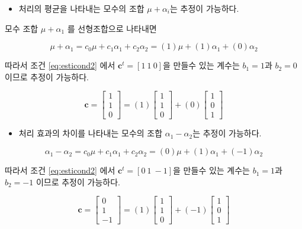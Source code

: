 \documentclass[
]{book}
\providecommand{\tightlist}{%
  \setlength{\itemsep}{0pt}\setlength{\parskip}{0pt}}
\theoremstyle{definition}
\theoremstyle{definition}
\theoremstyle{definition}
\theoremstyle{definition}
\theoremstyle{remark}
\begin{document}
\begin{itemize}
\tightlist
\item
  처리의 평균을 나타내는 모수의 조합 \(\mu + \alpha_i\)는 추정이 가능하다.
\end{itemize}

모수 조합 \(\mu + \alpha_1\) 를 선형조합으로 나타내면

\[ \mu + \alpha_1 = c_0 \mu + c_1 \alpha_1 + c_2 \alpha_2 = (1) \mu + (1) \alpha_1 + (0) \alpha_2 \]

따라서 조건 \eqref{eq:esticond2} 에서 \(\bm c^t = [1~1~0]\)을 만들수 있는 계수는 \(b_1=1\)과 \(b_2=0\) 이므로 추정이 가능하다.

\begin{equation*}
\bm c =
\begin{bmatrix}
1 \\
1 \\
0 
\end{bmatrix}
= 
(1)
\begin{bmatrix}
1 \\
1 \\
0 
\end{bmatrix}
+ 
(0)
\begin{bmatrix}
1 \\
0 \\
1 
\end{bmatrix}
\end{equation*}

\begin{itemize}
\tightlist
\item
  처리 효과의 차이를 나타내는 모수의 조합 \(\alpha_1-\alpha_2\)는 추정이 가능하다.
\end{itemize}

\[ \alpha_1 -\alpha_2= c_0 \mu + c_1 \alpha_1 + c_2 \alpha_2 = (0) \mu + (1) \alpha_1 + (-1) \alpha_2 \]

따라서 조건 \eqref{eq:esticond2} 에서 \(\bm c^t = [0~1~-1]\)을 만들수 있는 계수는 \(b_1=1\)과 \(b_2=-1\) 이므로 추정이 가능하다.

\begin{equation*}
\bm c =
\begin{bmatrix}
0 \\
1 \\
-1 
\end{bmatrix}
= 
(1)
\begin{bmatrix}
1 \\
1 \\
0 
\end{bmatrix}
+ 
(-1)
\begin{bmatrix}
1 \\
0 \\
1 
\end{bmatrix}
\end{equation*}
\end{document}

